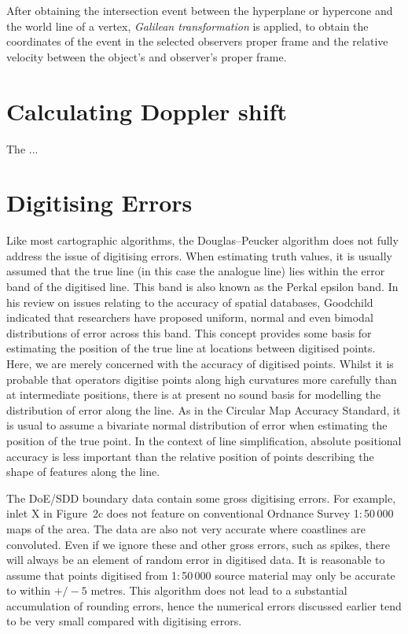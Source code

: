 \documentclass{egpubl}
\begin{document}
After obtaining the intersection event between the hyperplane or hypercone and the world line of a vertex, \emph{Galilean transformation} is applied, to obtain the coordinates of the event in the selected observers proper frame and the relative velocity between the object's and observer's proper frame.

\section{Calculating Doppler shift}
The ...













\section{Digitising Errors}
\label{sec:digErr}

Like most cartographic algorithms, the Douglas--Peucker algorithm does not
fully address the issue of digitising errors. When estimating truth values,
it is usually assumed that the true line (in this case the analogue line)
lies within the error band of the digitised line. This band is also known as
the Perkal epsilon band. In his review on issues relating to the accuracy of
spatial databases, Goodchild\cite{Lev90} indicated that researchers have
proposed uniform, normal and even bimodal distributions of error across this
band. This concept provides some basis for estimating the position of the
true line at locations between digitised points. Here, we are merely
concerned with the accuracy of digitised points. Whilst it is probable that
operators digitise points along high curvatures more carefully than at
intermediate positions, there is at present no sound basis for modelling the
distribution of error along the line. As in the Circular Map Accuracy
Standard, it is usual to assume a bivariate normal distribution of error when
estimating the position of the true point. In the context of line
simplification, absolute positional accuracy is less important than the
relative position of points describing the shape of features along the line.

The DoE/SDD boundary data contain some gross digitising errors. For example,
inlet X in Figure~2c does not feature on conventional Ordnance Survey
1:\,50\,000 maps of the area. The data are also not very accurate where
coastlines are convoluted. Even if we ignore these and other gross errors,
such as spikes, there will always be an element of random error in digitised
data. It is reasonable to assume that points digitised from 1:\,50\,000
source material may only be accurate to within $+/-5$ metres. This algorithm
does not lead to a substantial accumulation of rounding errors, hence the
numerical errors discussed earlier tend to be very small compared with
digitising errors.
\end{document}

